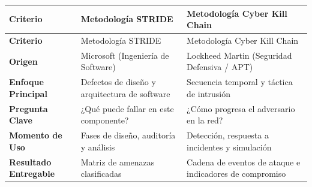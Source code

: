 \begin{center}
\begin{longtable}{>{\bfseries}p{3.8cm} p{5.5cm} p{5.5cm}}
\toprule
\rowcolor{outermarginbgcolor}
Criterio & Metodología STRIDE & Metodología Cyber Kill Chain \\
\midrule
\endfirsthead
\toprule
\rowcolor{outermarginbgcolor}
Criterio & Metodología STRIDE & Metodología Cyber Kill Chain \\
\midrule
\endhead
\bottomrule
\endfoot
Origen & Microsoft (Ingeniería de Software) & Lockheed Martin (Seguridad Defensiva / APT) \\
\midrule
Enfoque Principal & Defectos de diseño y arquitectura de software & Secuencia temporal y táctica de intrusión \\
\midrule
Pregunta Clave & ¿Qué puede fallar en este componente? & ¿Cómo progresa el adversario en la red? \\
\midrule
Momento de Uso & Fases de diseño, auditoría y análisis & Detección, respuesta a incidentes y simulación \\
\midrule
Resultado Entregable & Matriz de amenazas clasificadas & Cadena de eventos de ataque e indicadores de compromiso \\
\bottomrule
\end{longtable}
\end{center}
